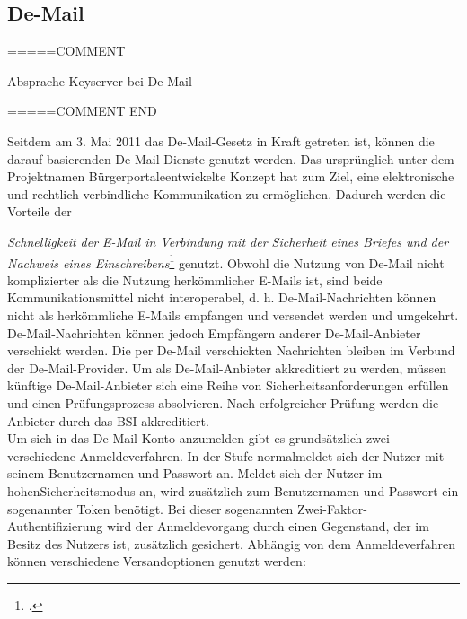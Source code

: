 \documentclass  [paper=a4,
				fontsize=12pt,
				listof=totoc,
				bibliography=totoc
				]{scrreprt}
\begin{document}
					
					
			\subsection{De-Mail}
			
			=====COMMENT
			
			Absprache Keyserver bei De-Mail
			
			=====COMMENT END
			
			Seitdem am 3. Mai 2011 das De-Mail-Gesetz in Kraft getreten ist, können die darauf basierenden De-Mail-Dienste genutzt werden.
			Das ursprünglich unter dem Projektnamen \glqq Bürgerportale\grqq entwickelte Konzept hat zum Ziel, eine elektronische und rechtlich verbindliche Kommunikation zu ermöglichen.
			Dadurch werden die Vorteile der {\textit{\glqq Schnelligkeit der E-Mail in Verbindung mit der Sicherheit eines Briefes und der Nachweis eines Einschreibens\grqq}\footcite[Vgl.][S. 8]{BSIDeMail} genutzt.
			Obwohl die Nutzung von De-Mail nicht komplizierter als die Nutzung herkömmlicher E-Mails ist, sind beide Kommunikationsmittel nicht interoperabel, d. h. De-Mail-Nachrichten können nicht als herkömmliche E-Mails empfangen und versendet werden und umgekehrt.
			De-Mail-Nachrichten können jedoch Empfängern anderer De-Mail-Anbieter verschickt werden.
			Die per De-Mail verschickten Nachrichten bleiben im Verbund der De-Mail-Provider.
			Um als De-Mail-Anbieter akkreditiert zu werden, müssen künftige De-Mail-Anbieter sich eine Reihe von Sicherheitsanforderungen erfüllen und einen Prüfungsprozess absolvieren.
			Nach erfolgreicher Prüfung werden die Anbieter durch das \ac{BSI} akkreditiert.\medskip\\
			
			Um sich in das De-Mail-Konto anzumelden gibt es grundsätzlich zwei verschiedene Anmeldeverfahren.
			In der Stufe \glqq normal\grqq meldet sich der Nutzer mit seinem Benutzernamen und Passwort an.
			Meldet sich der Nutzer im \glqq hohen\grqq Sicherheitsmodus an, wird zusätzlich zum Benutzernamen und Passwort ein sogenannter Token benötigt.
			Bei dieser sogenannten Zwei-Faktor-Authentifizierung wird der Anmeldevorgang durch einen Gegenstand, der im Besitz des Nutzers ist, zusätzlich gesichert.
			Abhängig von dem Anmeldeverfahren können verschiedene Versandoptionen genutzt werden:
			
}
\end{document}
